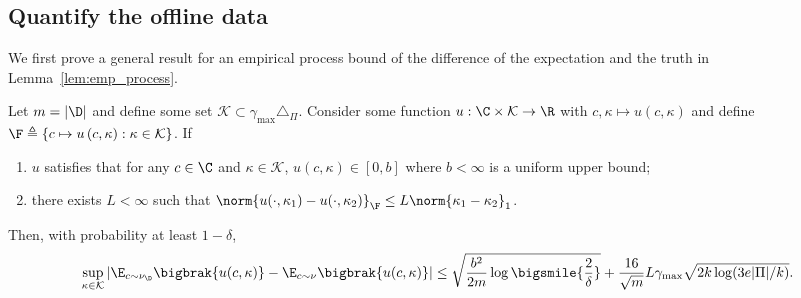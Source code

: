 \documentclass{article}
\newcommand{\mc}[1]{\mathcal{#1}}
\newcommand{\1}{\mathbf{1}}
\begin{document}
\subsection{Quantify the offline data}\label{sec:offline}

We first prove a general result for an empirical process bound of the difference of the expectation and the truth in Lemma~\ref{lem:emp_process}.  

\begin{lemma}\label{lem:emp_process}
Let $m=|\D|$ and define some set $\mc{K}\subset \gamma_{\max}\triangle_\Pi$. Consider some function $u:\C\times \mc{K}\to \R$ with $c,\kappa\mapsto u(c,\kappa)$ and define $\F\triangleq\{c\mapsto u\left(c,\kappa\right): \kappa\in\mc{K}\}$. If 
\begin{enumerate}
    \item $u$ satisfies that for any $c\in\C$ and $\kappa\in\mc{K}$, $u(c,\kappa)\in[0,b]$ where $b<\infty$ is a uniform upper bound;
    \item there exists $L<\infty$ such that $\norm{u(\cdot,\kappa_1)-u(\cdot,\kappa_2)}_\F\leq L\norm{\kappa_1-\kappa_2}_1$.
\end{enumerate}
Then, with probability at least $1-\delta$, \[\sup_{\kappa\in\mc{K}}\left|\E_{c\sim\nu_\D}\bigbrak{u(c,\kappa)}-\E_{c\sim\nu}\bigbrak{u(c,\kappa)}\right|\leq \sqrt{\frac{b^2}{2m}\log\bigsmile{\frac{2}{\delta}}}+\frac{16}{\sqrt{m}}L\gamma_{\max}\sqrt{2k\log(3e|\Pi|/k)}.\]
\end{lemma}
\end{document}
